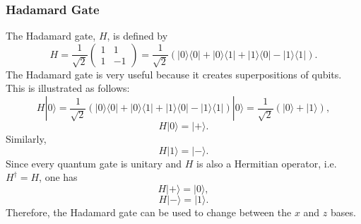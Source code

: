 \documentclass[a4paper]{article}
\begin{document}
\subsubsection{Hadamard Gate}
The Hadamard gate, $H$, is defined by
\begin{equation}
	H=
	\frac{1}{\sqrt{2}}
	\begin{pmatrix}
		1 & 1 \\
		1 &-1
	\end{pmatrix}=\frac{1}{\sqrt{2}}(|0\rangle\langle 0|+|0\rangle\langle 1|+|1\rangle\langle 0|-|1\rangle\langle 1|).
\end{equation}
The Hadamard gate is very useful because it creates superpositions of qubits. This is illustrated as follows:
\begin{equation}
H|0\rangle=\frac{1}{\sqrt{2}}(|0\rangle\langle 0|+|0\rangle\langle 1|+|1\rangle\langle 0|-|1\rangle\langle 1|)|0\rangle=\frac{1}{\sqrt{2}}(|0\rangle+|1\rangle),
\end{equation}
\begin{equation}
H|0\rangle=|+\rangle.
\end{equation}
Similarly,
\begin{equation}
H|1\rangle=|-\rangle.
\end{equation}
Since every quantum gate is unitary and $H$ is also a Hermitian operator, i.e. $H^\dagger=H$, one has
\begin{equation}
H|+\rangle=|0\rangle,
\end{equation}
\begin{equation}
H|-\rangle=|1\rangle.
\end{equation}
Therefore, the Hadamard gate can be used to change between the $x$ and $z$ bases.
\end{document}
